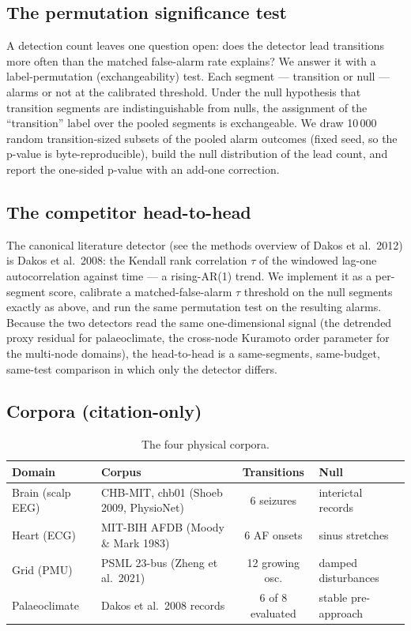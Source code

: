 \documentclass[aip,cha,preprint,amsmath,amssymb]{revtex4-2}
\begin{document}
\subsection{The permutation significance test}

A detection count leaves one question open: does the detector lead
transitions more often than the matched false-alarm rate explains? We
answer it with a label-permutation (exchangeability) test. Each segment
--- transition or null --- alarms or not at the calibrated threshold.
Under the null hypothesis that transition segments are indistinguishable
from nulls, the assignment of the ``transition'' label over the pooled
segments is exchangeable. We draw 10\,000 random transition-sized
subsets of the pooled alarm outcomes (fixed seed, so the p-value is
byte-reproducible), build the null distribution of the lead count, and
report the one-sided p-value with an add-one correction.

\subsection{The competitor head-to-head}

The canonical literature detector (see the methods overview of Dakos et
al.\ 2012) is Dakos et al.\ 2008: the Kendall
rank correlation $\tau$ of the windowed lag-one autocorrelation against
time --- a rising-AR(1) trend. We implement it as a per-segment score,
calibrate a matched-false-alarm $\tau$ threshold on the null segments
exactly as above, and run the same permutation test on the resulting
alarms. Because the two detectors read the same one-dimensional signal
(the detrended proxy residual for palaeoclimate, the cross-node
Kuramoto order parameter for the multi-node domains), the head-to-head
is a same-segments, same-budget, same-test comparison in which only the
detector differs.

\subsection{Corpora (citation-only)}

\begin{table}[h!]
\centering
\footnotesize
\setlength{\tabcolsep}{2.5pt}
\begin{tabular}{llcl}
\toprule
Domain & Corpus & Transitions & Null \\
\midrule
Brain (scalp EEG) & CHB-MIT, chb01 (Shoeb 2009, PhysioNet) & 6 seizures & interictal records \\
Heart (ECG) & MIT-BIH AFDB (Moody \& Mark 1983) & 6 AF onsets & sinus stretches \\
Grid (PMU) & PSML 23-bus (Zheng et al.\ 2021) & 12 growing osc. & damped disturbances \\
Palaeoclimate & Dakos et al.\ 2008 records & 6 of 8 evaluated & stable pre-approach \\
\bottomrule
\end{tabular}
\caption{The four physical corpora.}
\end{table}
\end{document}
